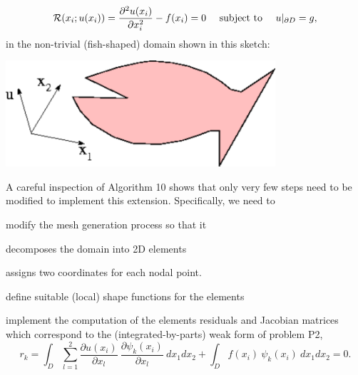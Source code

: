 \[ {\cal R}(x_i; u(x_i)) = \frac{\partial^2 u(x_i)}{\partial x_i^2} - f(x_i) =0 \mbox{ \ \ \ subject to \ \ \ } u|_{\partial D} = g, \] in the non-\/trivial (fish-\/shaped) domain shown in this sketch\+:  
\begin{DoxyImage}
\includegraphics[width=0.75\textwidth]{fish_domain}
\end{DoxyImage}
 A careful inspection of Algorithm 10 shows that only very few steps need to be modified to implement this extension. Specifically, we need to
\begin{DoxyItemize}
\item modify the mesh generation process so that it
\begin{DoxyItemize}
\item decomposes the domain into 2D elements
\item assigns two coordinates for each nodal point.
\end{DoxyItemize}
\item define suitable (local) shape functions for the elements
\item implement the computation of the elements\textquotesingle{} residuals and Jacobian matrices which correspond to the (integrated-\/by-\/parts) weak form of problem P2, \[ r_k = \int_D \sum_{l=1}^2 \frac{\partial u(x_i)}{\partial x_l} \ \frac{\partial \psi_k(x_i)}{\partial x_l} \ dx_1 dx_2 + \int_D f(x_i) \ \psi_k(x_i) \ dx_1 dx_2 =0. \]
\end{DoxyItemize}

